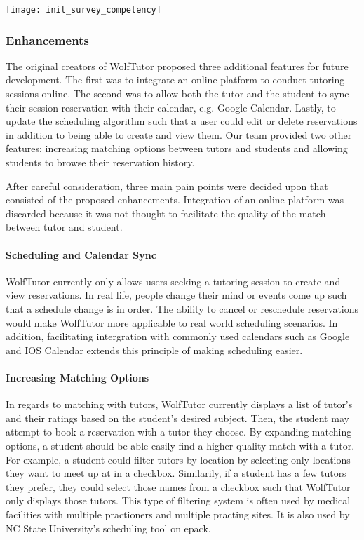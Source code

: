 
\begin{figure*}[ht]
  \centering
    \texttt{[image: init\_survey\_competency]}
    \label{fig:scatterplot}
\end{figure*}



\label{sec:possible-enhancements} 

\subsubsection{Enhancements} 
The original creators of WolfTutor proposed
three additional features for future development. The first was to
integrate an online platform to conduct tutoring sessions online. The
second was to allow both the tutor and the student to sync their
session reservation with their calendar, e.g. Google Calendar. Lastly,
to update the scheduling algorithm such that a user could edit or
delete reservations in addition to being able to create and view
them. Our team provided two other features: increasing matching
options between tutors and students and allowing students to browse
their reservation history.

After careful consideration, three main pain points were decided upon
that consisted of the proposed enhancements. Integration of an online
platform was discarded because it was not thought to facilitate the
quality of the match between tutor and student.

\paragraph{Scheduling and Calendar Sync} WolfTutor currently only
allows users seeking a tutoring session to create and view
reservations. In real life, people change their mind or events come up
such that a schedule change is in order. The ability to cancel or
reschedule reservations would make WolfTutor more applicable to real
world scheduling scenarios. In addition, facilitating intergration
with commonly used calendars such as Google and IOS Calendar extends
this principle of making scheduling easier.

\paragraph{Increasing Matching Options} In regards to matching with
tutors, WolfTutor currently displays a list of tutor's and their
ratings based on the student's desired subject. Then, the student may
attempt to book a reservation with a tutor they choose. By expanding
matching options, a student should be able easily find a higher
quality match with a tutor. For example, a student could filter tutors
by location by selecting only locations they want to meet up at in a
checkbox. Similarily, if a student has a few tutors they prefer, they
could select those names from a checkbox such that WolfTutor only
displays those tutors. This type of filtering system is often used by
medical facilities with multiple practioners and multiple practing
sites. It is also used by NC State University's scheduling tool on
epack.

